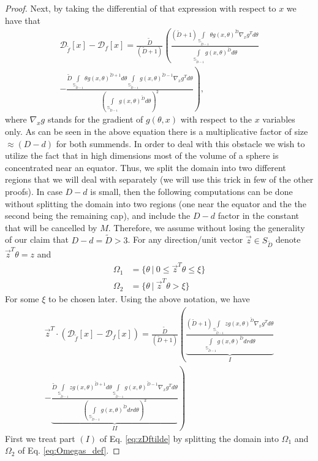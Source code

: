 \documentclass[12pt]{article}
\theoremstyle{remark}
\newcommand{\DD}{\mathcal{D}}
\newcommand{\wtilde}[1]{\widetilde{#1}}
\begin{document}
\begin{appendices}
\begin{proof}
Next, by taking the differential of that expression with respect to $x$ we have that 
\begin{multline*}
    \DD_{\wtilde{f}}[x] - \DD_f[x] =
\frac{\wtilde D}{(\wtilde D+1)}\left(
\frac{(\wtilde D+1)\int\limits_{\mathbb{S}_{\wtilde D-1}}\theta g(x,\theta)^{\wtilde D} \nabla_x g^T d\theta}
{\int\limits_{\mathbb{S}_{\wtilde D-1}}g(x,\theta)^{\wtilde D} d\theta} \right.\\
-\left.
\frac{\wtilde D\int\limits_{\mathbb{S}_{\wtilde D-1}}\theta g(x,\theta)^{\wtilde D+1} d\theta \int\limits_{\mathbb{S}_{\wtilde D-1}} g(x,\theta)^{\wtilde D-1}\nabla_x g^T d\theta}
{\left(\int\limits_{\mathbb{S}_{\wtilde D-1}}g(x,\theta)^{\wtilde D} d\theta\right)^2}     
\right)
,\end{multline*}
where $\nabla_x g$ stands for the gradient of $g(\theta, x)$ with respect to the $x$ variables only.
As can be seen in the above equation there is a multiplicative factor of size $\approx (D - d)$ for both summends.
In order to deal with this obstacle we wish to utilize the fact that in high dimensions most of the volume of a sphere is concentrated near an equator.
Thus, we split the domain into two different regions that we will deal with separately (we will use this trick in few of the other proofs). 
In case $D-d$ is small, then the following computations can be done without splitting the domain into two regions (one near the equator and the the second being the remaining cap), and include the $D-d$ factor in the constant that will be cancelled by $M$.
Therefore, we assume without losing the generality of our claim that $D-d = \wtilde D > 3$.
For any direction/unit vector $\vec{z}\in S_{\wtilde D}$ denote $\vec{z}^T\theta = z$ and 
\begin{equation}\label{eq:Omegas_def}
    \begin{aligned}
    \Omega_1 &= \{\theta~|~0\leq \vec{z}^T\theta \leq \xi\}\\
    \Omega_2 &= \{\theta~|~\vec{z}^T\theta > \xi\}
    \end{aligned}
\end{equation}
For some $\xi$ to be chosen later. Using the above notation, we have 
\begin{multline}\label{eq:zDftilde}
    \vec{z}^T\cdot  (\DD_{\wtilde{f}}[x] - \DD_f[x] )=
\frac{\wtilde D}{(\wtilde D+1)}\left(
\underbrace{\frac{(\wtilde D+1)\int\limits_{\mathbb{S}_{\wtilde D-1}}z g(x,\theta)^{\wtilde D} \nabla_x g^T d\theta}
{\int\limits_{\mathbb{S}_{\wtilde D-1}}g(x,\theta)^{\wtilde D} drd\theta}  }_{I} \right.  \\
-\left.
\underbrace{\frac{\wtilde D\int\limits_{\mathbb{S}_{\wtilde D-1}}z g(x,\theta)^{\wtilde D+1} d\theta \int\limits_{\mathbb{S}_{\wtilde D-1}} g(x,\theta)^{\wtilde D-1}\nabla_x g^T d\theta}
{\left(\int\limits_{\mathbb{S}_{\wtilde D-1}}g(x,\theta)^{\wtilde D} drd\theta\right)^2}}_{II}     
\right)
\end{multline}
First we treat part $(I)$ of Eq. \eqref{eq:zDftilde} by splitting the domain into $\Omega_1$ and $\Omega_2$ of Eq. \ref{eq:Omegas_def}.


\end{proof}
\end{appendices}
\end{document}
